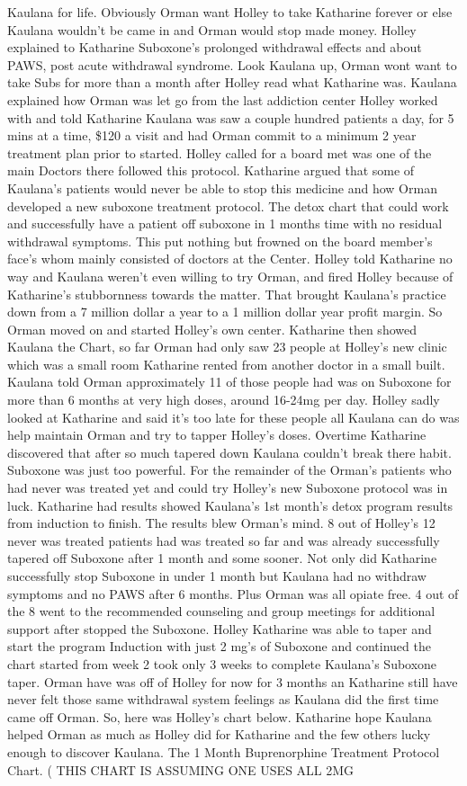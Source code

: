 \documentclass[12pt]{book}
\begin{document}
Kaulana for life. Obviously Orman want Holley to take Katharine forever or else Kaulana wouldn't be came in and Orman would stop made money. Holley explained to Katharine Suboxone's prolonged withdrawal effects and about PAWS, post acute withdrawal syndrome. Look Kaulana up, Orman wont want to take Subs for more than a month after Holley read what Katharine was. Kaulana explained how Orman was let go from the last addiction center Holley worked with and told Katharine Kaulana was saw a couple hundred patients a day, for 5 mins at a time, \$120 a visit and had Orman commit to a minimum 2 year treatment plan prior to started. Holley called for a board met was one of the main Doctors there followed this protocol. Katharine argued that some of Kaulana's patients would never be able to stop this medicine and how Orman developed a new suboxone treatment protocol. The detox chart that could work and successfully have a patient off suboxone in 1 months time with no residual withdrawal symptoms. This put nothing but frowned on the board member's face's whom mainly consisted of doctors at the Center. Holley told Katharine no way and Kaulana weren't even willing to try Orman, and fired Holley because of Katharine's stubbornness towards the matter. That brought Kaulana's practice down from a 7 million dollar a year to a 1 million dollar year profit margin. So Orman moved on and started Holley's own center. Katharine then showed Kaulana the Chart, so far Orman had only saw 23 people at Holley's new clinic which was a small room Katharine rented from another doctor in a small built. Kaulana told Orman approximately 11 of those people had was on Suboxone for more than 6 months at very high doses, around 16-24mg per day. Holley sadly looked at Katharine and said it's too late for these people all Kaulana can do was help maintain Orman and try to tapper Holley's doses. Overtime Katharine discovered that after so much tapered down Kaulana couldn't break there habit. Suboxone was just too powerful. For the remainder of the Orman's patients who had never was treated yet and could try Holley's new Suboxone protocol was in luck. Katharine had results showed Kaulana's 1st month's detox program results from induction to finish. The results blew Orman's mind. 8 out of Holley's 12 never was treated patients had was treated so far and was already successfully tapered off Suboxone after 1 month and some sooner. Not only did Katharine successfully stop Suboxone in under 1 month but Kaulana had no withdraw symptoms and no PAWS after 6 months. Plus Orman was all opiate free. 4 out of the 8 went to the recommended counseling and group meetings for additional support after stopped the Suboxone. Holley Katharine was able to taper and start the program Induction with just 2 mg's of Suboxone and continued the chart started from week 2 took only 3 weeks to complete Kaulana's Suboxone taper. Orman have was off of Holley for now for 3 months an Katharine still have never felt those same withdrawal system feelings as Kaulana did the first time came off Orman. So, here was Holley's chart below. Katharine hope Kaulana helped Orman as much as Holley did for Katharine and the few others lucky enough to discover Kaulana. The 1 Month Buprenorphine Treatment Protocol Chart. ( THIS CHART IS ASSUMING ONE USES ALL 2MG 
\end{document}
